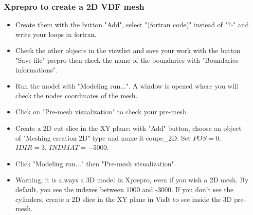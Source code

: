 \documentclass[10pt]{beamer}
\begin{document}
\begin{frame}
\frametitle{Xprepro to create a 2D VDF mesh}
\begin{block}{}

\begin{itemize}
\item Create them with the button "Add", select "(fortran code)" instead of "?$\square$" and write your loops in fortran.
\item Check the other objects in the viewlist and save your work with the button "Save file" prepro then check the name of the boundaries with "Boundaries informations".
\item Run the model with "Modeling run...". A window is opened where you will check the nodes coordinates of the mesh.
\item Click on "Pre-mesh visualization" to check your pre-mesh.

\item Create a 2D cut slice in the XY plane: with "Add" button, choose an object of "Meshing creation 2D" type and name it coupe\_2D. Set $POS=0$, $IDIR=3$, $INDMAT=-5000$.
\item Click "Modeling run..." then "Pre-mesh visualization".
\item Warning, it is always a 3D model in Xprepro, even if you wish a 2D mesh. By default, you see the indexes between 1000 and -3000. If you don't see the cylinders, create a 2D slice in the XY plane in VisIt to see inside the 3D pre-mesh.
\end{itemize}

\end{block}
\end{frame}
\end{document}
